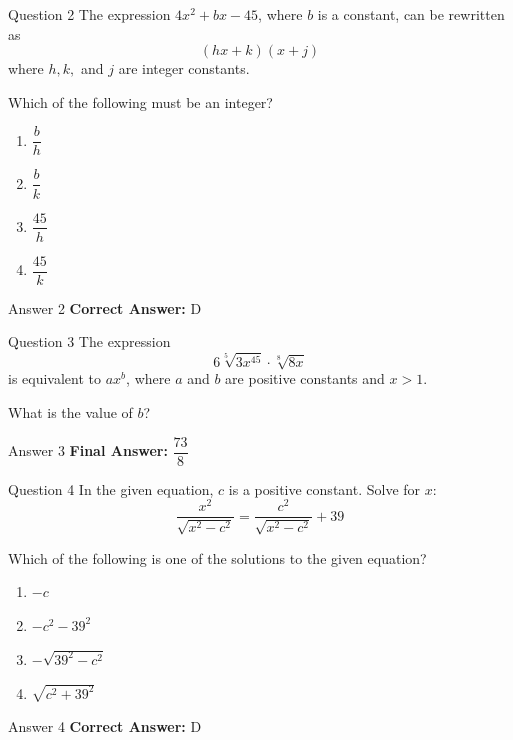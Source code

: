 \documentclass{beamer}
\begin{document}
\begin{frame}{Question 2}
\small
The expression \(4x^2 + bx - 45\), where \(b\) is a constant, can be rewritten as
\[
(hx + k)(x + j)
\]
where \(h, k,\) and \(j\) are integer constants.

Which of the following must be an integer?
\vspace{0.35cm}
\begin{enumerate}
    \item[A.] \(\dfrac{b}{h}\)
    \item[B.] \(\dfrac{b}{k}\)
    \item[C.] \(\dfrac{45}{h}\)
    \item[D.] \(\dfrac{45}{k}\)
\end{enumerate}
\end{frame}
\begin{frame}{Answer 2}
\small
\textbf{Correct Answer:} D
\end{frame}

\begin{frame}{Question 3}
\small
The expression
\[
6\sqrt[5]{3x^{45}} \cdot \sqrt[8]{8x}
\]
is equivalent to \(ax^b\), where \(a\) and \(b\) are positive constants and \(x > 1\).

What is the value of \(b\)?
\end{frame}
\begin{frame}{Answer 3}
\small
\textbf{Final Answer:} $\boxed{\dfrac{73}{8}}$
\end{frame}

\begin{frame}{Question 4}
\small
In the given equation, \(c\) is a positive constant. Solve for \(x\):
\[
\frac{x^2}{\sqrt{x^2 - c^2}} = \frac{c^2}{\sqrt{x^2 - c^2}} + 39
\]

Which of the following is one of the solutions to the given equation?
\vspace{0.35cm}
\begin{enumerate}
    \item[A.] \(-c\)
    \item[B.] \(-c^2 - 39^2\)
    \item[C.] \(-\sqrt{39^2 - c^2}\)
    \item[D.] \(\sqrt{c^2 + 39^2}\)
\end{enumerate}
\end{frame}
\begin{frame}{Answer 4}
\small
\textbf{Correct Answer:} D
\end{frame}
\end{document}
